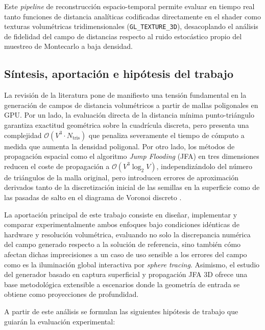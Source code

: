 Este \textit{pipeline} de reconstrucción espacio-temporal permite evaluar en tiempo real tanto funciones de distancia analíticas codificadas directamente en el shader como texturas volumétricas tridimensionales (\texttt{GL\_TEXTURE\_3D}), desacoplando el análisis de fidelidad del campo de distancias respecto al ruido estocástico propio del muestreo de Montecarlo a baja densidad.

\subsection{Síntesis, aportación e hipótesis del trabajo}

La revisión de la literatura pone de manifiesto una tensión fundamental en la generación de campos de distancia volumétricos a partir de mallas poligonales en GPU. Por un lado, la evaluación directa de la distancia mínima punto-triángulo garantiza exactitud geométrica sobre la cuadrícula discreta, pero presenta una complejidad $\mathcal{O}(V^3 \cdot N_{\text{tris}})$ que penaliza severamente el tiempo de cómputo a medida que aumenta la densidad poligonal. Por otro lado, los métodos de propagación espacial como el algoritmo \textit{Jump Flooding} (JFA) en tres dimensiones reducen el coste de propagación a $\mathcal{O}(V^3 \log_2 V)$, independizándolo del número de triángulos de la malla original, pero introducen errores de aproximación derivados tanto de la discretización inicial de las semillas en la superficie como de las pasadas de salto en el diagrama de Voronoi discreto \cite{rong2006}.

La aportación principal de este trabajo consiste en diseñar, implementar y comparar experimentalmente ambos enfoques bajo condiciones idénticas de hardware y resolución volumétrica, evaluando no solo la discrepancia numérica del campo generado respecto a la solución de referencia, sino también cómo afectan dichas imprecisiones a un caso de uso sensible a los errores del campo como es la iluminación global interactiva por \textit{sphere tracing}. Asimismo, el estudio del generador basado en captura superficial y propagación JFA 3D ofrece una base metodológica extensible a escenarios donde la geometría de entrada se obtiene como proyecciones de profundidad.

A partir de este análisis se formulan las siguientes hipótesis de trabajo que guiarán la evaluación experimental:

